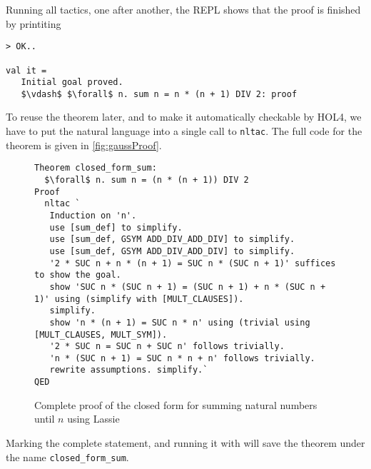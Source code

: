 Running all tactics, one after another, the REPL shows that the proof is finished by printiting
\begin{lstlisting}
> OK..

val it =
   Initial goal proved.
   $\vdash$ $\forall$ n. sum n = n * (n + 1) DIV 2: proof
\end{lstlisting}

To reuse the theorem later, and to make it automatically checkable by HOL4, we
have to put the natural language into a single call to \lstinline{nltac}.
The full code for the theorem is given in \autoref{fig:gaussProof}.
%
\begin{figure}[t]
\begin{lstlisting}[mathescape=true]
Theorem closed_form_sum:
  $\forall$ n. sum n = (n * (n + 1)) DIV 2
Proof
  nltac `
   Induction on 'n'.
   use [sum_def] to simplify.
   use [sum_def, GSYM ADD_DIV_ADD_DIV] to simplify.
   use [sum_def, GSYM ADD_DIV_ADD_DIV] to simplify.
   '2 * SUC n + n * (n + 1) = SUC n * (SUC n + 1)' suffices to show the goal.
   show 'SUC n * (SUC n + 1) = (SUC n + 1) + n * (SUC n + 1)' using (simplify with [MULT_CLAUSES]).
   simplify.
   show 'n * (n + 1) = SUC n * n' using (trivial using [MULT_CLAUSES, MULT_SYM]).
   '2 * SUC n = SUC n + SUC n' follows trivially.
   'n * (SUC n + 1) = SUC n * n + n' follows trivially.
   rewrite assumptions. simplify.`
QED
\end{lstlisting}
\caption{Complete proof of the closed form for summing natural numbers until $n$ using Lassie}\label{fig:gaussProof}
\end{figure}

Marking the complete statement, and running it with  will save the
theorem under the name \lstinline{closed_form_sum}.
